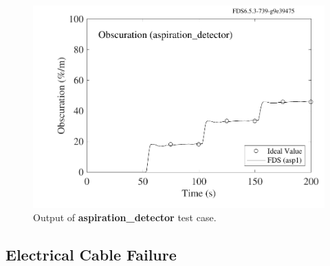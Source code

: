 \documentclass[11pt]{book}
\begin{document}
\begin{figure}[ht]
\begin{center}
\includegraphics[width=4.in]{SCRIPT_FIGURES/aspiration_detector}
\end{center}
\caption[Output of {\bf aspiration\_detector} test case.]{Output of {\bf aspiration\_detector} test case.}
\label{aspiration_detector}
\end{figure}



\subsection{Electrical Cable Failure}
\label{info:THIEF}
\end{document}
